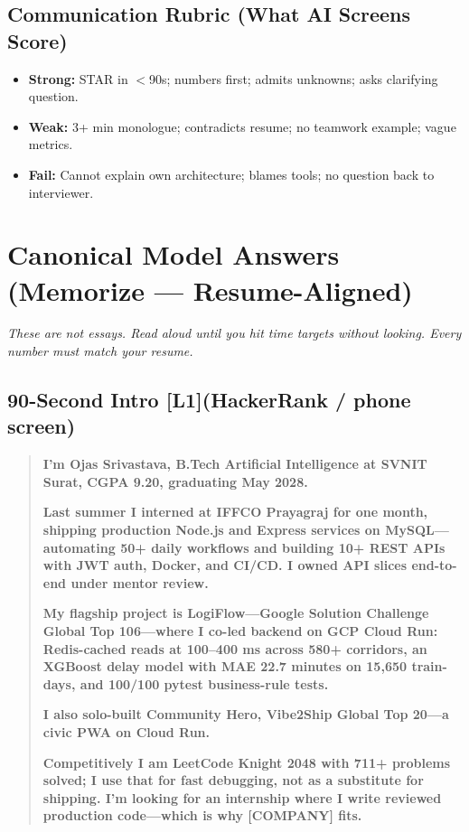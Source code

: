 \documentclass[9pt,a4paper]{article}
\newcommand{\diffLone}{\textcolor{green!50!black}{\textbf{[L1]}}}
\begin{document}
\subsection{Communication Rubric (What AI Screens Score)}
\begin{itemize}
  \item \textbf{Strong:} STAR in $<$90s; numbers first; admits unknowns; asks clarifying question.
  \item \textbf{Weak:} 3+ min monologue; contradicts resume; no teamwork example; vague metrics.
  \item \textbf{Fail:} Cannot explain own architecture; blames tools; no question back to interviewer.
\end{itemize}
\newpage

\newpage
\section{Canonical Model Answers (Memorize --- Resume-Aligned)}
\textit{These are not essays. Read aloud until you hit time targets without looking. Every number must match your resume.}

\subsection{90-Second Intro \diffLone (HackerRank / phone screen)}
\begin{quote}\small
\textbf{I'm Ojas Srivastava, B.Tech Artificial Intelligence at SVNIT Surat, CGPA 9.20, graduating May 2028.}

\textbf{Last summer I interned at IFFCO Prayagraj for one month, shipping production Node.js and Express services on MySQL---automating 50+ daily workflows and building 10+ REST APIs with JWT auth, Docker, and CI/CD. I owned API slices end-to-end under mentor review.}

\textbf{My flagship project is LogiFlow---Google Solution Challenge Global Top 106---where I co-led backend on GCP Cloud Run: Redis-cached reads at 100--400 ms across 580+ corridors, an XGBoost delay model with MAE 22.7 minutes on 15,650 train-days, and 100/100 pytest business-rule tests.}

\textbf{I also solo-built Community Hero, Vibe2Ship Global Top 20---a civic PWA on Cloud Run.}

\textbf{Competitively I am LeetCode Knight 2048 with 711+ problems solved; I use that for fast debugging, not as a substitute for shipping. I'm looking for an internship where I write reviewed production code---which is why [COMPANY] fits.}
\end{quote}
\end{document}
